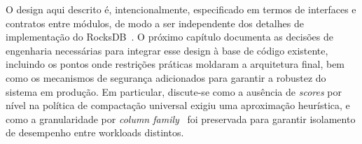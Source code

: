 O design aqui descrito é, intencionalmente, especificado em termos de interfaces
e contratos entre módulos, de modo a ser independente dos detalhes de implementação
do RocksDB~\cite{rocksdb_wiki}. O próximo capítulo documenta as decisões de
engenharia necessárias para integrar esse design à base de código existente,
incluindo os pontos onde restrições práticas moldaram a arquitetura final, bem como
os mecanismos de segurança adicionados para garantir a robustez do sistema em
produção. Em particular, discute-se como a ausência de \textit{scores} por nível
na política de compactação universal exigiu uma aproximação heurística, e como a
granularidade por \textit{column family}~\cite{rocksdb} foi preservada para
garantir isolamento de desempenho entre workloads distintos.
